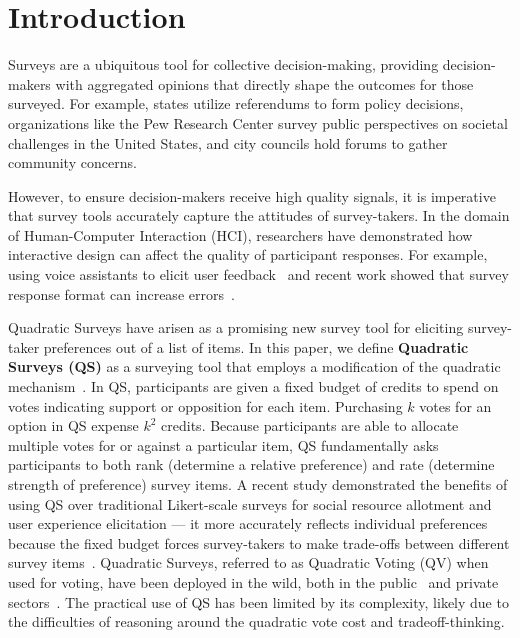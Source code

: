 \section{Introduction}

Surveys are a ubiquitous tool for collective decision-making, providing decision-makers with aggregated opinions that directly shape the outcomes for those surveyed. For example, states utilize referendums to form policy decisions, organizations like the Pew Research Center survey public perspectives on societal challenges in the United States, and city councils hold forums to gather community concerns.

However, to ensure decision-makers receive high quality signals, it is imperative that survey tools accurately capture the attitudes of survey-takers. In the domain of Human-Computer Interaction (HCI), researchers have demonstrated how interactive design can affect the quality of participant responses. For example, using voice assistants to elicit user feedback~\cite{xiaoLetMeAsk2021} and recent work showed that survey response format can increase errors~\cite{pielotDidYouMisclick2024}.

Quadratic Surveys have arisen as a promising new survey tool for eliciting survey-taker preferences out of a list of items. In this paper, we define \textbf{Quadratic Surveys (QS)} as a surveying tool that employs a modification of the quadratic mechanism~\cite{grovesOptimalAllocationPublic1977}. In QS, participants are given a fixed budget of credits to spend on votes indicating support or opposition for each item. Purchasing $k$ votes for an option in QS expense $k^2$ credits. Because participants are able to allocate multiple votes for or against a particular item, QS fundamentally asks participants to both rank (determine a relative preference) and rate (determine strength of preference) survey items. A recent study demonstrated the benefits of using QS over traditional Likert-scale surveys for social resource allotment and user experience elicitation --- it more accurately reflects individual preferences because the fixed budget forces survey-takers to make trade-offs between different survey items~\cite{chengCanShowWhat2021}. Quadratic Surveys, referred to as Quadratic Voting (QV) when used for voting, have been deployed in the wild, both in the public~\cite{rogersColoradoTriedNew2019, teamTaiwanDigitalMinister} and private sectors~\cite{Gov4gitDecentralizedPlatform2023}. The practical use of QS has been limited by its complexity, likely due to the difficulties of reasoning around the quadratic vote cost and tradeoff-thinking.

